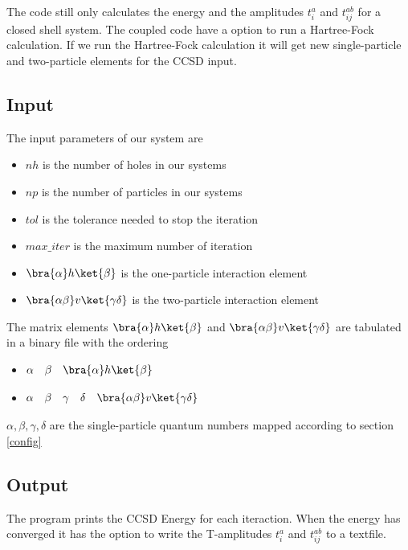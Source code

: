 The code still only calculates the energy and the amplitudes $t_i^a$ and $t_{ij}^{ab}$ for a closed shell system. The coupled code have a option to run a Hartree-Fock calculation. If we run the Hartree-Fock calculation it will get new single-particle and two-particle elements for the CCSD input.

\subsection{Input}
The input parameters of our system are

\begin{itemize}
  \item $nh$ is the number of holes in our systems
  \item $np$ is the number of particles in our systems
  \item $tol$ is the tolerance needed to stop the iteration
  \item $max\_iter$ is the maximum number of iteration
  \item $\bra{\alpha}h\ket{\beta}$ is the one-particle interaction element
  \item $\bra{\alpha\beta}v\ket{\gamma \delta}$ is the two-particle interaction element
\end{itemize}
%
The matrix elements $\bra{\alpha}h\ket{\beta}$ and $\bra{\alpha\beta}v\ket{\gamma \delta}$ are tabulated in a binary file with the ordering

\begin{itemize}
  \item $\begin{matrix}\alpha & \beta & \bra{\alpha}h\ket{\beta} \end{matrix}$       
  \item $\begin{matrix}\alpha & \beta & \gamma & \delta & \bra{\alpha\beta}v\ket{\gamma \delta} \end{matrix}$      
\end{itemize}
%
$\alpha,\beta,\gamma,\delta$ are the single-particle quantum numbers mapped according to section \ref{config}

\subsection{Output}
The program prints the CCSD Energy for each iteraction. When the energy has converged it has the option to write the T-amplitudes $t_i^a$ and $t_{ij}^{ab}$ to a textfile.

